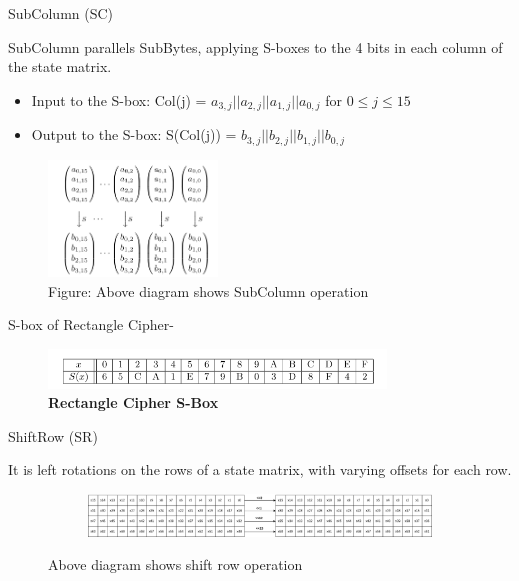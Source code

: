 \begin{frame}{SubColumn (SC)}
\begin{block}{}
SubColumn parallels SubBytes, applying S-boxes to the 4 bits in each column of the state matrix.
\begin{itemize}
    \item Input to the S-box: Col(j) = $a_{3,j} || a_{2,j} || a_{1,j} || a_{0,j}$ for $0 \leq j \leq 15$
    \item Output to the S-box: S(Col(j)) = $b_{3,j} || b_{2,j} || b_{1,j} || b_{0,j}$
\end{itemize}
    \begin{figure}[H]
    \centering
    \includegraphics[width=0.4\textwidth]{SubColumn.png}
    \caption*{Figure: Above diagram shows SubColumn operation}
\end{figure}
S-box of Rectangle Cipher-
\begin{figure}
\centering
    \includegraphics[width=0.8\textwidth]{S-Box.png}
    \caption*{ \textbf{Rectangle Cipher S-Box}}
\end{figure}
    
\end{block}
\end{frame}

\begin{frame}{ShiftRow (SR)}
\begin{block}{}
    It is left rotations on the rows of a state matrix,
with varying offsets for each row.
\begin{figure}[h!]
    \centering
    \begin{subfigure}[b]{1.0\textwidth}
        \centering
        \includegraphics[width=\textwidth]{SR.drawio.png} 
        \label{fig:image1}
    \end{subfigure}
    \caption{Above diagram shows shift row operation}
    \label{fig:two_images}
\end{figure}
    
\end{block}
\end{frame}

